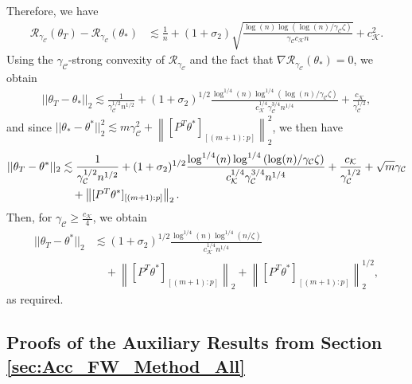 \documentclass{article}
\begin{document}
Therefore, we have
\begin{align*}
\mathcal{R}_{\gamma_{\mathcal{C}}}(\theta_T) - \mathcal{R}_{\gamma_{\mathcal{C}}}(\theta_{*}) &\lesssim \frac{1}{n} + (1 + \sigma_2)\sqrt{\frac{\log(n)\log\left(\log(n)/\gamma_{\mathcal{C}}\zeta\right)}{\gamma_{\mathcal{C}}c_{\mathcal{K}}n}} + c_{\mathcal{K}}^2.
\end{align*}
Using the $\gamma_{\mathcal{C}}$-strong convexity of $\mathcal{R}_{\gamma_{\mathcal{C}}}$ and the fact that $\nabla\mathcal{R}_{\gamma_{\mathcal{C}}}(\theta_{*}) = 0$, we obtain
\begin{align*}
||\theta_T - \theta_{*}||_2 \lesssim \frac{1}{\gamma_{\mathcal{C}}^{1/2}n^{1/2}} + (1 + \sigma_2)^{1/2}\frac{\log^{1/4}(n)\log^{1/4}\left(\log(n)/\gamma_{\mathcal{C}}\zeta\right)}{c_{\mathcal{K}}^{1/4}\gamma_{\mathcal{C}}^{3/4}n^{1/4}} + \frac{c_{\mathcal{K}}}{\gamma_{\mathcal{C}}^{1/2}},
\end{align*}
and since $||\theta_{*} - \theta^*||_2^2 \lesssim m\gamma_{\mathcal{C}}^2 + \left\|[P^T\theta^*]_{[(m+1):p]}\right\|_2^2$, we then have
\begin{align}
\label{eq:HT_ACCFWl=0_best_gc}
||\theta_T - \theta^*||_2 &\lesssim \frac{1}{\gamma_{\mathcal{C}}^{1/2}n^{1/2}} + (1 + \sigma_2)^{1/2}\frac{\log^{1/4}(n)\log^{1/4}\left(\log(n)/\gamma_{\mathcal{C}}\zeta\right)}{c_{\mathcal{K}}^{1/4}\gamma_{\mathcal{C}}^{3/4}n^{1/4}} + \frac{c_{\mathcal{K}}}{\gamma_{\mathcal{C}}^{1/2}} + \sqrt{m}\gamma_{\mathcal{C}} \notag\\
& \quad + \left\|[P^T\theta^*]_{[(m+1):p]}\right\|_2.
\end{align}
Then, for $\gamma_{\mathcal{C}} \geq \frac{c_{\mathcal{K}}}{4}$, we obtain
\begin{align*}
||\theta_T - \theta^*||_2 &\lesssim (1 + \sigma_2)^{1/2}\frac{\log^{1/4}(n)\log^{1/4}\left(n/\zeta\right)}{c_{\mathcal{K}}^{1/4}n^{1/4}}\\
& \quad + \left\|[P^T\theta^*]_{[(m+1):p]}\right\|_2 + \left\|[P^T\theta^*]_{[(m+1):p]}\right\|_2^{1/2},
\end{align*}
as required.


\subsection{Proofs of the Auxiliary Results from Section \ref{sec:Acc_FW_Method_All}}\label{sec:Proofs of the Auxiliary Results_ACC_FW}
\end{document}
